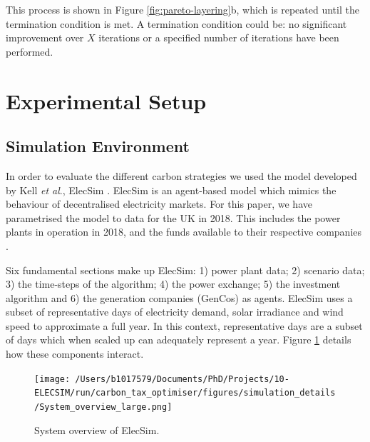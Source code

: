 \documentclass[sigconf]{acmart}
\begin{document}
This process is shown in Figure \ref{fig:pareto-layering}b, which is repeated until the termination condition is met. A termination condition could be:  no significant improvement over $X$ iterations or a specified number of iterations have been performed. 



\section{Experimental Setup}
\label{sec:sim_environment}


\subsection{Simulation Environment}
In order to evaluate the different carbon strategies we used the model developed by Kell \textit{et al}., ElecSim \cite{Kell,Kell2020}. ElecSim is an agent-based model which mimics the behaviour of decentralised electricity markets. For this paper, we have parametrised the model to data for the UK in 2018. This includes the power plants in operation in 2018, and the funds available to their respective companies \cite{dukes_511, companies_house}.

Six fundamental sections make up ElecSim: 1) power plant data; 2) scenario data; 3) the time-steps of the algorithm; 4) the power exchange; 5) the investment algorithm and 6) the generation companies (GenCos) as agents. ElecSim uses a subset of representative days of electricity demand, solar irradiance and wind speed to approximate a full year. In this context, representative days are a subset of days which when scaled up can adequately represent a year. Figure \ref{fig:model_details} details how these components interact.

\begin{figure}
\centering
\texttt{[image: /Users/b1017579/Documents/PhD/Projects/10-ELECSIM/run/carbon\_tax\_optimiser/figures/simulation\_details/System\_overview\_large.png]}
\caption{System overview of ElecSim.}
\label{fig:model_details}
\end{figure}
\end{document}
